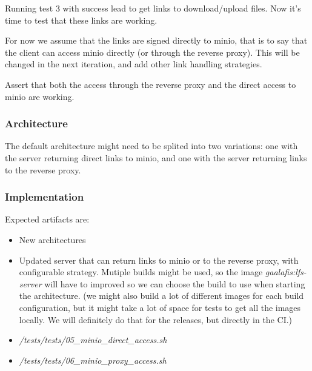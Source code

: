 Running test 3 with success lead to get links to download/upload files. Now it's time to test that these links are working.

For now we assume that the links are signed directly to minio, that is to say that the client can access minio directly (or through the reverse proxy). This will be changed in the next iteration, and add other link handling strategies.

Assert that both the access through the reverse proxy and the direct access to minio are working.

\subsubsection{Architecture}

The default architecture might need to be splited into two variations: one with the server returning direct links to minio, and one with the server returning links to the reverse proxy.

\subsubsection{Implementation}

Expected artifacts are:

\begin{itemize}
    \item New architectures
    \item Updated server that can return links to minio or to the reverse proxy, with configurable strategy. Mutiple builds might be used, so the image \textit{gaalafis:lfs-server} will have to improved so we can choose the build to use when starting the architecture. (we might also build a lot of different images for each build configuration, but it might take a lot of space for tests to get all the images locally. We will definitely do that for the releases, but directly in the CI.)
    \item \textit{/tests/tests/05\_minio\_direct\_access.sh}
    \item \textit{/tests/tests/06\_minio\_proxy\_access.sh}
\end{itemize}
